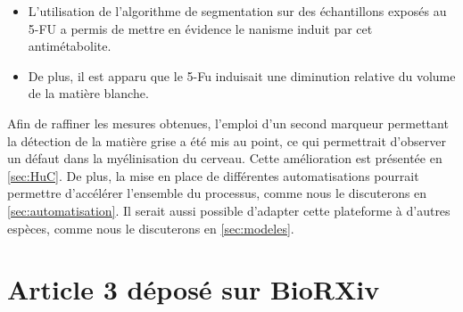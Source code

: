 \documentclass[\main/main.tex]{subfiles}
\begin{document}
\begin{itemize}
    \item
    L'utilisation de l'algorithme de segmentation sur des échantillons exposés au 5-FU
    a permis de mettre en évidence le nanisme induit par cet antimétabolite. 
    
    \item
    De plus, il est apparu que le 5-Fu induisait une diminution relative du volume de la matière blanche.
    
\end{itemize}

Afin de raffiner les mesures obtenues, l'emploi d'un second marqueur permettant la détection de la matière grise a été mis au point, ce qui permettrait d'observer un défaut dans la myélinisation du cerveau. Cette amélioration est présentée en \autoref{sec:HuC}.
%
De plus, la mise en place de différentes automatisations pourrait permettre d'accélérer l'ensemble du processus, comme nous le discuterons en \autoref{sec:automatisation}.
%
Il serait aussi possible d'adapter cette plateforme à d'autres espèces, comme nous le discuterons en \autoref{sec:modeles}.

\section{Article 3 déposé sur BioRXiv}
\end{document}
